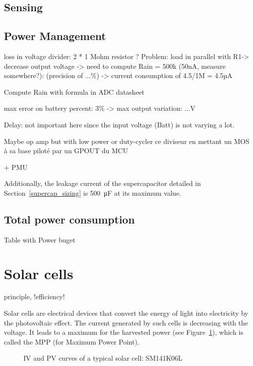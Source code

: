 \documentclass{EPL-master-thesis-covers-EN}
\begin{document}
\subsection*{Sensing}



\subsection*{Power Management}

loss in voltage divider: 2 * 1 Mohm resistor ? Problem: load in parallel with R1-> decrease output voltage -> need to compute Rain = 500k (50nA, measure somewhere?): (precision of ...\%) -> current consumption of 4.5/1M = 4.5µA

Compute Rain with formula in ADC datasheet

max error on battery percent: 3\% -> max output variation: ...V

Delay: not important here since the input voltage (Batt) is not varying a lot.

Maybe op amp but with low power or duty-cycler ce diviseur en mettant un MOS à sa base piloté par un GPOUT du MCU

+ PMU

Additionally, the leakage current of the supercapacitor detailed in Section~\ref{supercap_sizing} is \SI{500}{\micro F} at its maximum value.

\subsection*{Total power consumption}

Table with Power buget

\section{Solar cells}

principle, !efficiency!

Solar cells are electrical devices that convert the energy of light into electricity by the photovoltaic effect. The current generated by such cells is decreasing with the voltage. It leads to a maximum for the harvested power (see Figure~\ref{fig:solar_IV}), which is called the MPP (for Maximum Power Point).

\begin{figure}[H]
    \centering
    
    \caption{IV and PV curves of a typical solar cell: SM141K06L}
    \label{fig:solar_IV}
\end{figure}
\end{document}
